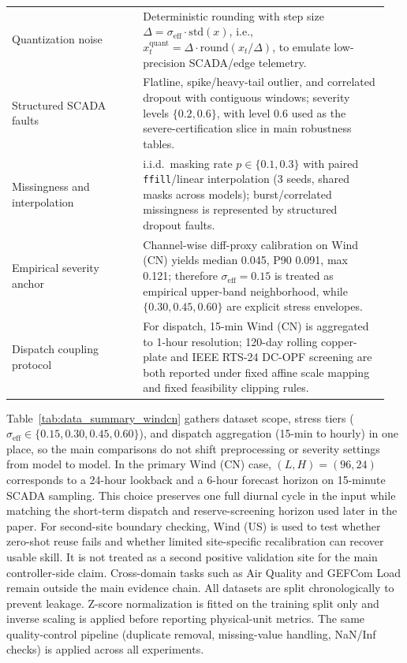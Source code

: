 \documentclass[review,1p,times]{elsarticle}
\begin{document}
\begin{longtable}{@{}>{\raggedright\arraybackslash}p{0.33\linewidth}>{\raggedright\arraybackslash}p{0.62\linewidth}@{}}
Quantization noise & Deterministic rounding with step size $\Delta=\sigma_{\mathrm{eff}}\cdot \mathrm{std}(x)$, i.e., $x_t^{\mathrm{quant}}=\Delta \cdot \mathrm{round}(x_t/\Delta)$, to emulate low-precision SCADA/edge telemetry. \\
Structured SCADA faults & Flatline, spike/heavy-tail outlier, and correlated dropout with contiguous windows; severity levels $\{0.2,0.6\}$, with level 0.6 used as the severe-certification slice in main robustness tables. \\
Missingness and interpolation & i.i.d.\ masking rate $p\in\{0.1,0.3\}$ with paired \texttt{ffill}/linear interpolation (3 seeds, shared masks across models); burst/correlated missingness is represented by structured dropout faults. \\
Empirical severity anchor & Channel-wise diff-proxy calibration on Wind (CN) yields median 0.045, P90 0.091, max 0.121; therefore $\sigma_{\mathrm{eff}}=0.15$ is treated as empirical upper-band neighborhood, while $\{0.30,0.45,0.60\}$ are explicit stress envelopes. \\
Dispatch coupling protocol & For dispatch, 15-min Wind (CN) is aggregated to 1-hour resolution; 120-day rolling copper-plate and IEEE RTS-24 DC-OPF screening are both reported under fixed affine scale mapping and fixed feasibility clipping rules. \\
\bottomrule
\end{longtable}
\endgroup

Table~\ref{tab:data_summary_windcn} gathers dataset scope, stress tiers ($\sigma_{\mathrm{eff}}\in\{0.15,0.30,0.45,0.60\}$), and dispatch aggregation (15-min to hourly) in one place, so the main comparisons do not shift preprocessing or severity settings from model to model. In the primary Wind (CN) case, $(L,H)=(96,24)$ corresponds to a 24-hour lookback and a 6-hour forecast horizon on 15-minute SCADA sampling. This choice preserves one full diurnal cycle in the input while matching the short-term dispatch and reserve-screening horizon used later in the paper. For second-site boundary checking, Wind (US) is used to test whether zero-shot reuse fails and whether limited site-specific recalibration can recover usable skill. It is not treated as a second positive validation site for the main controller-side claim. Cross-domain tasks such as Air Quality and GEFCom Load remain outside the main evidence chain. All datasets are split chronologically to prevent leakage. Z-score normalization is fitted on the training split only and inverse scaling is applied before reporting physical-unit metrics. The same quality-control pipeline (duplicate removal, missing-value handling, NaN/Inf checks) is applied across all experiments.
\end{document}
